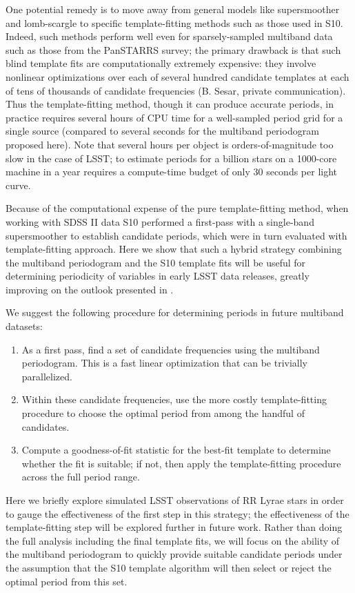 \documentclass{emulateapj}
\begin{document}
One potential remedy is to move away from general models like supersmoother and lomb-scargle to specific template-fitting methods such as those used in S10.
Indeed, such methods perform well even for sparsely-sampled multiband data such as those from the PanSTARRS survey; the primary drawback is that such blind template fits are computationally extremely expensive: they involve nonlinear optimizations over each of several hundred candidate templates at each of tens of thousands of candidate frequencies (B. Sesar, private communication).
Thus the template-fitting method, though it can produce accurate periods, in practice requires several hours of CPU time for a well-sampled period grid for a single source (compared to several seconds for the multiband periodogram proposed here).
Note that several hours per object is orders-of-magnitude too slow in the case of LSST; to estimate periods for a billion stars on a 1000-core machine in a year requires a compute-time budget of only 30 seconds per light curve.

Because of the computational expense of the pure template-fitting method, when working with SDSS II data S10 performed a first-pass with a single-band supersmoother to establish candidate periods, which were in turn evaluated with template-fitting approach.
Here we show that such a hybrid strategy combining the multiband periodogram and the S10 template fits will be useful for determining periodicity of variables in early LSST data releases, greatly improving on the outlook presented in \citet{Oluseyi12}.

We suggest the following procedure for determining periods in future multiband datasets:
\begin{enumerate}
   \item As a first pass, find a set of candidate frequencies using the multiband periodogram. This is a fast linear optimization that can be trivially parallelized.
   \item Within these candidate frequencies, use the more costly template-fitting procedure to choose the optimal period from among the handful of candidates.
   \item Compute a goodness-of-fit statistic for the best-fit template to determine whether the fit is suitable; if not, then apply the template-fitting procedure across the full period range.
\end{enumerate}
Here we briefly explore simulated LSST observations of RR Lyrae stars in order to gauge the effectiveness of the first step in this strategy; the effectiveness of the template-fitting step will be explored further in future work.
Rather than doing the full analysis including the final template fits, we will focus on the ability of the multiband periodogram to quickly provide suitable candidate periods under the assumption that the S10 template algorithm will then select or reject the optimal period from this set.
\end{document}
